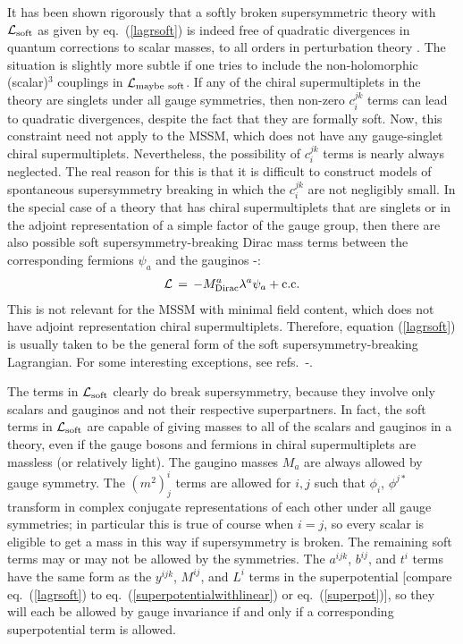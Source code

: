 \documentclass[11pt]{article}
\def\beq{\begin{eqnarray}}
\def\eeq{\end{eqnarray}}
\def\lagr{{\cal L}}
\begin{document}
It has been shown rigorously that a softly broken supersymmetric theory
with $\lagr_{\rm soft}$ as given by eq.~(\ref{lagrsoft}) is indeed free of
quadratic divergences in quantum corrections to scalar masses, to all
orders in perturbation theory \cite{softterms}. The situation is slightly
more subtle if one tries to include the non-holomorphic (scalar)$^3$
couplings in $\lagr_{{\rm maybe}\>\,{\rm soft}}$. If any of the chiral
supermultiplets in the theory are singlets under all gauge symmetries,
then non-zero $c_i^{jk}$ terms can lead to quadratic divergences, despite
the fact that they are formally soft. Now, this constraint need not apply
to the MSSM, which does not have any gauge-singlet chiral supermultiplets.
Nevertheless, the possibility of $c_i^{jk}$ terms is nearly always
neglected. The real reason for this is that it is difficult to
construct models of spontaneous supersymmetry breaking in which the
$c_i^{jk}$ are not negligibly small.  
In the special case of a theory that has 
chiral supermultiplets that are singlets or 
in the adjoint representation of a simple factor of the gauge group,
then there are also possible soft supersymmetry-breaking Dirac mass
terms between the corresponding fermions $\psi_a$ and the gauginos
\cite{Polchinski:1982an}-\cite{Fox:2002bu}:
\beq
{\cal L} \,=\,  -M_{\rm Dirac}^a \lambda^a \psi_a + {\rm c.c.}
\label{eq:Diracgauginos}
\eeq
This is not relevant for the MSSM with minimal field 
content, which does not have adjoint representation chiral 
supermultiplets. Therefore, equation (\ref{lagrsoft}) is usually taken to 
be the general form of the soft supersymmetry-breaking Lagrangian. For 
some interesting exceptions, see 
refs.~\cite{Polchinski:1982an}-\cite{Plehn:2008ae}.

The terms in $\lagr_{\rm soft}$ clearly do break supersymmetry, 
because they involve
only scalars and gauginos and not their respective superpartners. In fact,
the soft terms in $\lagr_{\rm soft}$ are capable of giving masses to all
of the scalars and gauginos in a theory, even if the gauge bosons and
fermions in chiral supermultiplets are massless (or relatively light). The
gaugino masses $M_a$ are always allowed by gauge symmetry. The $(m^2)_j^i$
terms are allowed for $i,j$ such that $\phi_i$, $\phi^{j*}$ transform in
complex conjugate representations of each other under all gauge
symmetries; in particular this is true of course when $i=j$, so every
scalar is eligible to get a mass in this way if supersymmetry is broken. 
The remaining soft terms may or may not be allowed by the symmetries. 
The $a^{ijk}$, $b^{ij}$, and $t^i$ 
terms have the same form as the $y^{ijk}$, $M^{ij}$, and $L^i$ terms in 
the superpotential [compare eq.~(\ref{lagrsoft}) to 
eq.~(\ref{superpotentialwithlinear})
or eq.~(\ref{superpot})], so they will each be allowed by gauge 
invariance if and only if a corresponding superpotential term is allowed. 
\end{document}
